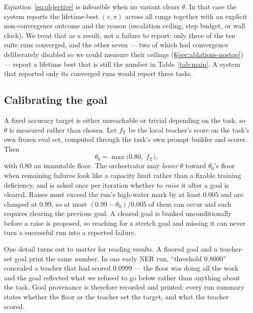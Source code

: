 \documentclass[sigconf,10pt]{acmart}
\newcommand{\xref}[1]{\S\ref{#1}}
\begin{document}
Equation~\ref{eq:objective} is infeasible when no variant clears $\theta$. In that case the
system reports the lifetime-best $(v,\pi)$ across all rungs together with an explicit
non-convergence outcome and the reason (escalation ceiling, step budget, or wall clock).
We treat that as a result, not a failure to report: only three of the ten suite runs
converged, and the other seven --- two of which had convergence deliberately disabled so we
could measure their ceilings (\xref{sec:ablations-nostop}) --- report a lifetime best that is
still the number in Table~\ref{tab:main}. A system that reported only its converged runs
would report three tasks.

\subsection{Calibrating the goal}
\label{sec:formulation-goal}

A fixed accuracy target is either unreachable or trivial depending on the task, so $\theta$
is measured rather than chosen. Let $f_{\mathrm{T}}$ be the local teacher's score on the
task's own frozen eval set, computed through the task's own prompt builder and scorer. Then
\begin{equation}
\theta_0 = \max\bigl(0.80,\; f_{\mathrm{T}}\bigr),
\label{eq:theta}
\end{equation}
with $0.80$ an immutable floor. The orchestrator may \emph{lower} $\theta$ toward
$\theta_0$'s floor when remaining failures look like a capacity limit rather than a fixable
training deficiency, and is asked once per iteration whether to \emph{raise} it after a goal
is cleared. Raises must exceed the run's high-water mark by at least $0.005$ and are clamped
at $0.99$, so at most $(0.99-\theta_0)/0.005$ of them can occur and each requires clearing
the previous goal. A cleared goal is banked unconditionally before a raise is proposed, so
reaching for a stretch goal and missing it can never turn a successful run into a reported
failure.

One detail turns out to matter for reading results. A floored goal and a teacher-set goal
print the same number. In one early NER run, ``threshold 0.8000'' concealed a teacher that
had scored $0.0999$ --- the floor was doing all the work and the goal reflected what we
refused to go below rather than anything about the task. Goal provenance is therefore
recorded and printed: every run summary states whether the floor or the teacher set the
target, and what the teacher scored.
\end{document}
